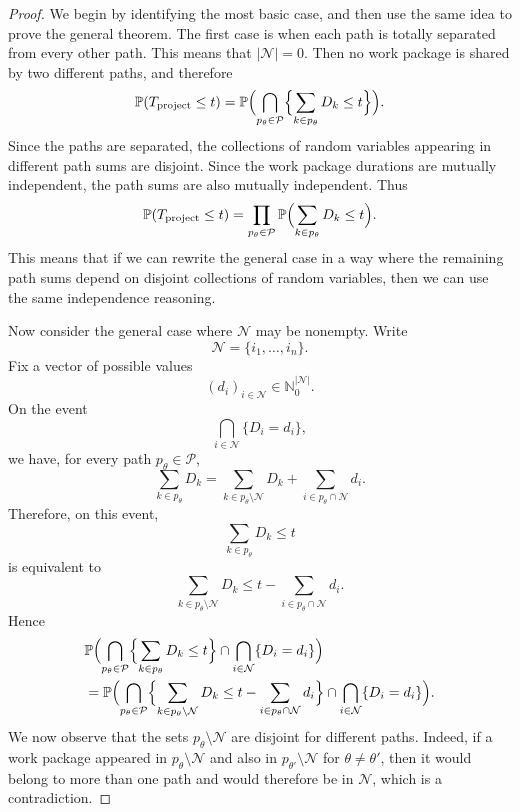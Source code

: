 \documentclass[11pt,a4paper]{article}
\newcommand{\pP}{\mathbb{P}}
\newcommand{\1}{\mathbf{1}}
\theoremstyle{definition}
\theoremstyle{plain}
\theoremstyle{remark}
\numberwithin{equation}{section}
\begin{document}
\begin{proof}
We begin by identifying the most basic case, and then use the same idea to prove the general theorem. The first case is when each path is totally separated from every other path. This means that $|\mathcal{N}|=0$. Then no work package is shared by two different paths, and therefore
\[
\pP(T_{\text{project}}\leq t)
=
\pP \Bigl(
\bigcap_{p_\theta \in \mathcal{P}}
\Bigl\{
\sum_{k \in p_\theta}D_k \leq t
\Bigr\}
\Bigr).
\]
Since the paths are separated, the collections of random variables appearing in different path sums are disjoint. Since the work package durations are mutually independent, the path sums are also mutually independent. Thus
\[
\pP(T_{\text{project}}\leq t)
=
\prod_{p_\theta \in \mathcal{P}}
\pP \Bigl(
\sum_{k \in p_\theta}D_k \leq t
\Bigr).
\]
This means that if we can rewrite the general case in a way where the remaining path sums depend on disjoint collections of random variables, then we can use the same independence reasoning.

Now consider the general case where $\mathcal{N}$ may be nonempty. Write
\[
\mathcal{N}=\{i_1,\ldots,i_n\}.
\]
Fix a vector of possible values
\[
(d_i)_{i\in\mathcal{N}}\in \mathbb{N}_0^{|\mathcal{N}|}.
\]
On the event
\[
\bigcap_{i\in\mathcal{N}}\{D_i=d_i\},
\]
we have, for every path $p_\theta\in\mathcal{P}$,
\[
\sum_{k\in p_\theta}D_k
=
\sum_{k\in p_\theta\setminus\mathcal{N}}D_k
+
\sum_{i\in p_\theta\cap\mathcal{N}}d_i.
\]
Therefore, on this event,
\[
\sum_{k\in p_\theta}D_k\leq t
\]
is equivalent to
\[
\sum_{k\in p_\theta\setminus\mathcal{N}}D_k
\leq
t-\sum_{i\in p_\theta\cap\mathcal{N}}d_i.
\]
Hence
\[
\begin{aligned}
&\pP \Bigl(
\bigcap_{p_\theta \in \mathcal{P}}
\Bigl\{
\sum_{k \in p_\theta}D_k \leq t
\Bigr\}
\cap
\bigcap_{i \in \mathcal{N}}
\{D_i=d_i\}
\Bigr)
\\
&=
\pP \Bigl(
\bigcap_{p_\theta \in \mathcal{P}}
\Bigl\{
\sum_{k \in p_\theta\setminus\mathcal{N}}D_k
\leq
t-\sum_{i \in p_\theta\cap\mathcal{N}}d_i
\Bigr\}
\cap
\bigcap_{i \in \mathcal{N}}
\{D_i=d_i\}
\Bigr).
\end{aligned}
\]
We now observe that the sets $p_\theta\setminus\mathcal{N}$ are disjoint for different paths. Indeed, if a work package appeared in $p_\theta\setminus\mathcal{N}$ and also in $p_{\theta'}\setminus\mathcal{N}$ for $\theta\neq\theta'$, then it would belong to more than one path and would therefore be in $\mathcal{N}$, which is a contradiction.


\end{proof}
\end{document}
